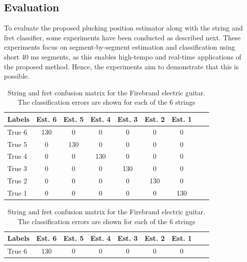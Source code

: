 \documentclass{article}
\begin{document}
\begin{sloppy}
\section{Evaluation} %
\label{sec:experiments}
To evaluate the proposed plucking position estimator along with the string and fret classifier, some experiments have been conducted as described next. These experiments focus on segment-by-segment estimation and classification using short 40 ms segments, as this enables high-tempo and real-time applications of the proposed method. Hence, the experiments aim to demonstrate that this is possible.
%
%
%
%
%

\begin{table}\centering %
\caption{String and fret confusion matrix for the Martin  acoustic guitar. The classification errors are shown for each of the 6 strings.}
\label{tbl:string_confusion_martin}
\begin{tabularx}{0.46\textwidth}{@{}l*{7}{c}c@{}}
\toprule
Labels &Est. 6   &Est. 5 &Est. 4   &Est. 3   &Est. 2   &Est. 1   \\ 
\midrule
True 6   &130 \cellcolor[gray]{.8} &0  &0  &0  &0  &0  \\  
True 5   &0  & 130\cellcolor[gray]{.8} & 0   &0  &0  &0  \\
True 4   &0  &0  &130 \cellcolor[gray]{.8} &0  &0  &0  \\  
True 3   &0  &0  &0  &130 \cellcolor[gray]{.8} &0  &0  \\  
True 2   &0  &0  &0  &0  &130 \cellcolor[gray]{.8} &0  \\  
True 1   &0  &0  &0  &0  &0  &130 \cellcolor[gray]{.8} \\  
\bottomrule
\end{tabularx}
%
\vspace{6mm}
\caption{String and fret confusion matrix for the Firebrand electric guitar. The classification errors are shown for each of the 6 strings}
\label{tbl:str_confusion_firebrand}
\begin{tabularx}{0.46\textwidth}{@{}l*{7}{c}c@{}}
\toprule
Labels &Est. 6   &Est. 5 &Est. 4   &Est. 3   &Est. 2   &Est. 1   \\ 
\midrule
True 6   &130 \cellcolor[gray]{.8}       & 0                        &0      &0  &0  &0 \\

\end{tabularx}
\end{table}
\end{sloppy}
\end{document}
